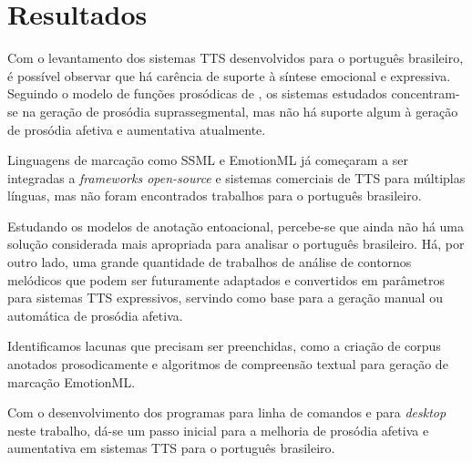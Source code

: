 
\chapter{Resultados}
Com o levantamento dos sistemas TTS desenvolvidos para o português brasileiro, é
possível observar que há carência de suporte à síntese emocional e expressiva.
Seguindo o modelo de funções prosódicas de , os sistemas
estudados concentram-se na geração de prosódia suprassegmental, mas não há
suporte algum à geração de prosódia afetiva e aumentativa atualmente.

Linguagens de marcação como SSML e EmotionML já começaram a ser integradas a
\emph{frameworks open-source} e sistemas comerciais de TTS para múltiplas
línguas, mas não foram encontrados trabalhos para o português brasileiro.

Estudando os modelos de anotação entoacional, percebe-se que ainda não há uma
solução considerada mais apropriada para analisar o português brasileiro. Há,
por outro lado, uma grande quantidade de trabalhos de análise de contornos
melódicos que podem ser futuramente adaptados e convertidos em parâmetros para
sistemas TTS expressivos, servindo como base para a geração manual ou automática
de prosódia afetiva.

Identificamos lacunas que precisam ser preenchidas, como a criação de corpus
anotados prosodicamente e algoritmos de compreensão textual para geração de
marcação EmotionML.

Com o desenvolvimento dos programas para linha de comandos e para \emph{desktop}
neste trabalho, dá-se um passo inicial para a melhoria de prosódia afetiva e
aumentativa em sistemas TTS para o português brasileiro.